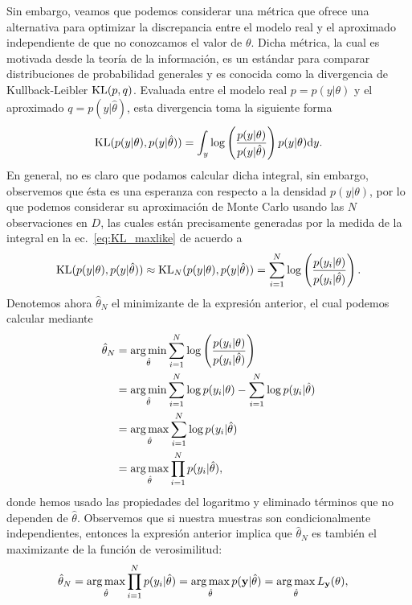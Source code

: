 Sin embargo, veamos que podemos considerar una métrica que ofrece una alternativa para optimizar la discrepancia entre el modelo real y el aproximado independiente de que no conozcamos el valor de $\theta$. Dicha métrica, la cual es motivada desde la teoría de la información, es un estándar para comparar distribuciones de probabilidad generales y es conocida como la divergencia de Kullback-Leibler $\operatorname{\text{KL}}(p,q) $. Evaluada entre el modelo real $p =  p(y|\theta)$ y el aproximado $q  = p(y|\hat\theta)$, esta divergencia toma la siguiente forma 
\begin{equation}
 	\operatorname{\text{KL}}( p(y|\theta),p(y|\hat\theta)) =  \int_y\log\left(\frac{p(y|\theta)}{p(y|\hat\theta)}\right)p(y|\theta){\text d} y.\label{eq:KL_maxlike}
 \end{equation} 
 En general, no es claro que podamos calcular dicha integral, sin embargo, observemos que ésta es una  esperanza con respecto a la densidad $p(y|\theta)$, por lo que podemos considerar su aproximación de Monte Carlo usando las $N$ observaciones en $D$, las cuales están precisamente generadas por la medida de la integral en la ec.~\eqref{eq:KL_maxlike} de acuerdo a 
\begin{equation}
	\operatorname{\text{KL}}( p(y|\theta),p(y|\hat\theta)) 	\approx \operatorname{\text{KL}}_N( p(y|\theta),p(y|\hat\theta)) = \sum_{i=1}^N\log\left(\frac{p(y_i|\theta)}{p(y_i|\hat\theta)}\right).
\end{equation}
 Denotemos ahora $\hat\theta_N$ el minimizante de la  expresión anterior, el cual podemos calcular mediante\begin{align}
 	\hat\theta_N & =  \operatorname*{arg\,min}_{\hat\theta}  \sum_{i=1}^N\log\left(\frac{p(y_i|\theta)}{p(y_i|\hat\theta)}\right)\\
 				&= \operatorname*{arg\,min}_{\hat\theta}  \sum_{i=1}^N  \log p(y_i|\theta) - \sum_{i=1}^N \log p(y_i|\hat\theta)\nonumber\\
 				&= \operatorname*{arg\,max}_{\hat\theta}  \sum_{i=1}^N \log p(y_i|\hat\theta)\nonumber\\
 				&= \operatorname*{arg\,max}_{\hat\theta}  \prod_{i=1}^N p(y_i|\hat\theta),\nonumber
 \end{align}
 donde hemos usado las propiedades del logaritmo y eliminado términos que no dependen de $\hat\theta$. Observemos que si nuestra muestras son condicionalmente independientes, entonces la expresión anterior implica que $\hat\theta_N$ es también el maximizante de la función de verosimilitud:
 \begin{align}
 	\hat\theta_N &= \operatorname*{arg\,max}_{\hat\theta}  \prod_{i=1}^N p(y_i|\hat\theta) = \operatorname*{arg\,max}_{\hat\theta}  p(\mathbf{y}|\hat\theta) = \operatorname*{arg\,max}_{\hat\theta}  L_{\mathbf{y}}(\theta),
 \end{align}

